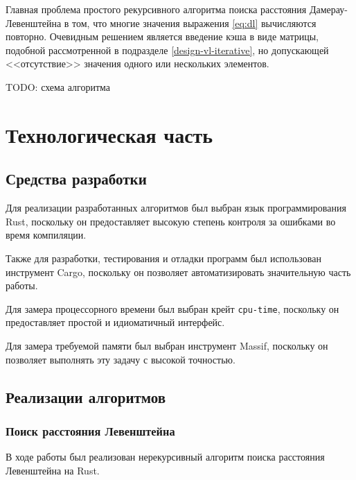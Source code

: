 \documentclass{report}
\begin{document}
Главная проблема простого рекурсивного алгоритма поиска расстояния
Дамерау-Левенштейна в том, что многие значения выражения
\ref{eq:dl} вычисляются повторно. Очевидным решением является
введение кэша в виде матрицы, подобной рассмотренной в подразделе
\ref{design-vl-iterative}, но допускающей <<отсутствие>> значения
одного или нескольких элементов.

TODO: схема алгоритма

\chapter{Технологическая часть}

\section{Средства разработки}

Для реализации разработанных алгоритмов был выбран язык
программирования Rust, поскольку он предоставляет высокую степень
контроля за ошибками во время компиляции.

Также для разработки, тестирования и отладки программ был
использован инструмент Cargo, поскольку он позволяет
автоматизировать значительную часть работы.

Для замера процессорного времени был выбран крейт
\texttt{cpu-time}, поскольку он предоставляет простой и
идиоматичный интерфейс.

Для замера требуемой памяти был выбран инструмент Massif,
поскольку он позволяет выполнять эту задачу с высокой точностью.

\section{Реализации алгоритмов}

\subsection{Поиск расстояния Левенштейна}

В ходе работы был реализован нерекурсивный алгоритм поиска
расстояния Левенштейна на Rust.
\end{document}
